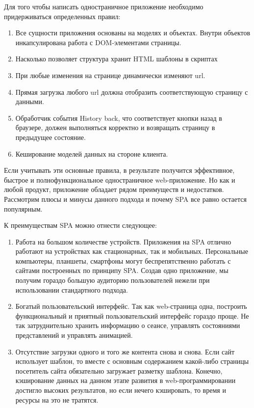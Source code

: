 Для того чтобы написать одностраничное приложение необходимо придерживаться определенных правил:
\begin{enumerate}
\item Все сущности приложения основаны на моделях и объектах. Внутри объектов инкапсулирована работа с DOM-элементами страницы.
\item Насколько позволяет структура хранит HTML шаблоны в скриптах
\item При любые изменения на странице динамически изменяют url.
\item Прямая загрузка любого url должна отобразить соответствующую страницу с данными.
\item Обработчик события History back, что соответствует кнопки назад в браузере, должен выполняться корректно и возвращать страницу в предыдущее состояние.
\item Кеширование моделей данных на стороне клиента.
\end{enumerate}

Если учитывать эти основные правила, в результате получится эффективное, быстрое и полнофункциональное одностраничное web-приложение.   Но как и любой продукт, приложение обладает рядом преимуществ и недостатков. Рассмотрим плюсы и минусы данного подхода и почему SPA все равно остается популярным.

К преимуществам SPA можно отнести следующее:
\begin{enumerate}
\item Работа на большом количестве устройств. Приложения на SPA отлично работают на устройствах как стационарных, так и мобильных. Персональные компьютеры, планшеты, смартфоны могут беспрепятственно работать с сайтами построенных по принципу SPA. Создав одно приложение, мы получим гораздо большую аудиторию пользователей нежели при использовании стандартного подхода.
\item  Богатый пользовательский интерфейс. Так как web-страница одна, построить функциональный и приятный пользовательский интерфейс гораздо проще. Не так затруднительно хранить информацию о сеансе, управлять состояниями представлений и управлять анимацией.
\item Отсутствие загрузки одного и того же контента снова и снова. Если сайт использует шаблон, то вместе с основным содержанием какой-либо страницы посетитель сайта обязательно загружает разметку шаблона. Конечно, кэширование данных на данном этапе развития в web-программировании достигло высоких результатов, но если нечего кэшировать, то время  и ресурсы на это не тратятся.
\end{enumerate}

